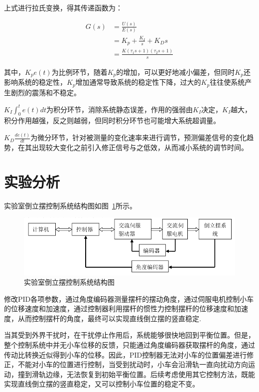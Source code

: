 上式进行拉氏变换，得其传递函数为：

\begin{equation}
\begin{aligned}
G(s)&=\frac{U(s)}{E(s)}\\
&=K_p+\frac{K_I}{s}+K_Ds\\
&=\frac{K(\tau_1s+1)(\tau_2s+1)}{s}
\end{aligned}
\end{equation}

其中，$K_pe(t)$为比例环节，随着$K_p$的增加，可以更好地减小偏差，但同时$K_p$还影响系统的稳定性，$K_p$增加通常导致系统的稳定性下降，过大的$K_p$往往使系统产生剧烈的震荡和不稳定。

$K_I\int_0^te(t)dt$为积分环节，消除系统静态误差，作用的强弱由$K_I$决定，$K_I$越大，积分作用越强，反之则越弱，但同时积分环节也可能增大系统超调量。

$K_D\frac{de(t)}{dt}$为微分环节，针对被测量的变化速率来进行调节，预测偏差信号的变化趋势，在其出现较大变化之前引入修正信号与之低效，从而减小系统的调节时间。

\section{实验分析}

实验室倒立摆控制系统结构图如图~\ref{fig:structure}所示。

\begin{figure}[hbpt]
\centering
\includegraphics[width=12cm]{structure.png}
\caption{实验室倒立摆控制系统结构图}\label{fig:structure}
\end{figure}

修改PID各项参数，通过角度编码器测量摆杆的摆动角度，通过伺服电机控制小车的位移速度和加速度，通过控制器利用摆杆的惯性力控制摆杆的位移速度和加速度，从而控制摆杆的角度，最终可以实现直线倒立摆的竖直稳定.

当其受到外界干扰时，在干扰停止作用后，系统能够很快地回到平衡位置。但是，整个控制系统中并无小车位移的反馈，只能通过角度编码器获取摆杆的角度，通过传动比转换近似得到小车的位移。因此，PID控制器无法对小车的位置偏差进行修正，不能对小车的位置进行控制，当受到扰动时，小车会沿滑轨一直向扰动方向运动，撞到滑轨边缘，无法恢复到初始平衡位置。后续考虑使用其它控制方法，既能实现直线倒立摆的竖直稳定，又可以控制小车位置的稳定不变。

